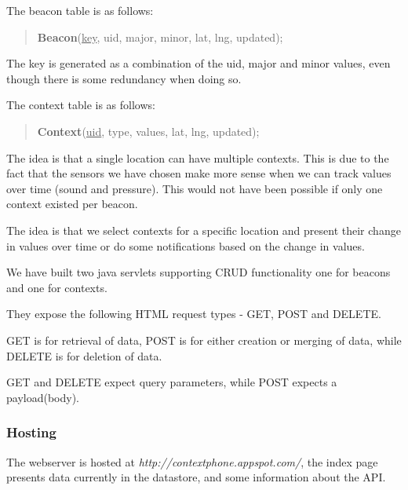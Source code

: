 \documentclass{sigchi}
\begin{document}
The beacon table is as follows:
\begin{quotation}
\textbf{Beacon}(\underline{key}, uid, major, minor, lat, lng, updated);
\end{quotation}
The key is generated as a combination of the uid, major and minor values, even though there is some redundancy when doing so.

The context table is as follows:
\begin{quotation}
\textbf{Context}(\underline{uid}, type, values, lat, lng, updated);
\end{quotation}
The idea is that a single location can have multiple contexts. This is due to the fact that the sensors we have chosen make more sense when we can track values over time (sound and pressure).
This would not have been possible if only one context existed per beacon.

The idea is that we select contexts for a specific location and present their change in values over time or do some notifications based on the change in values.




We have built two java servlets supporting CRUD functionality one for beacons and one for contexts.

They expose the following HTML request types - GET, POST and DELETE.

GET is for retrieval of data, POST is for either creation or merging of data, while DELETE is for deletion of data.

GET and DELETE expect query parameters, while POST expects a payload(body).

\subsubsection{Hosting}
The webserver is hosted at \textit{http://contextphone.appspot.com/}, the index page presents data currently in the datastore, and some information about the API.
\end{document}
